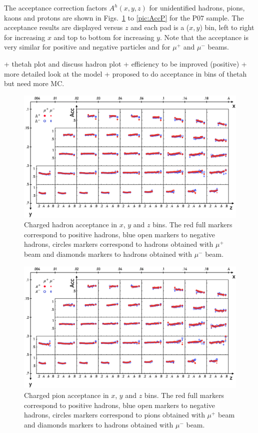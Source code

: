 The acceptance correction factors $A^h(x,y,z)$ for unidentified hadrons, pions, kaons and protons are shown in Figs.~\ref{pic:AccH} to \ref{pic:AccP} for the P$07$ sample. The acceptance results are displayed versus $z$ and each pad is a ($x,y$) bin, left to right for increasing $x$ and top to bottom for increasing $y$. Note that the acceptance is very similar for positive and negative particles and for $\mu^+$ and $\mu^-$ beams.

+ thetah plot and discuss hadron plot + efficiency to be improved (positive) + more detailed look at the model + proposed to do acceptance in bins of thetah but need more MC.

\begin{figure}
  \centering
	\includegraphics[scale=0.6]{./gfx/AccH.png}
	\caption{Charged hadron acceptance in $x$, $y$ and $z$ bins. The red full markers correspond to positive hadrons, blue open markers to negative hadrons, circles markers correspond to hadrons obtained with $\mu^+$ beam and diamonds markers to hadrons obtained with $\mu^-$ beam.}
	\label{pic:AccH}
\end{figure}

\begin{figure}
  \centering
	\includegraphics[scale=0.6]{./gfx/AccPi.png}
	\caption{Charged pion acceptance in $x$, $y$ and $z$ bins. The red full markers correspond to positive hadrons, blue open markers to negative hadrons, circles markers correspond to pions obtained with $\mu^+$ beam and diamonds markers to hadrons obtained with $\mu^-$ beam.}
	\label{pic:AccPi}
\end{figure}

